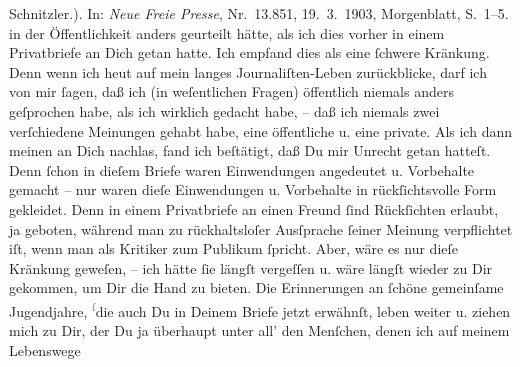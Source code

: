 \begin{ledgroupsized}[t]{13cm}
{{{{                        Schnitzler.)}. In: \emph{Neue Freie
                        Presse}, Nr. 13.851, 19. 3. 1903,
                     Morgenblatt, S. 1–5.}}}\label{K_L03478-4h} in der Öffentlichkeit anders geurteilt hätte, als ich dies vorher
               in einem Privatbriefe an Dich getan hatte. Ich empfand dies als eine ſchwere
               Kränkung. Denn wenn ich heut auf mein langes Journaliſten-Leben zurückblicke, darf
               ich von mir ſagen, daß ich (in weſentlichen Fragen) öffentlich niemals anders
               geſprochen habe, als ich wirklich gedacht habe, – daß ich niemals zwei verſchiedene
               Meinungen gehabt habe, eine öffentliche {\pb}u. eine
               private. Als ich dann meinen \label{K_L03478-5v}\label{K_L03478-5h} an Dich nachlas, fand ich beſtätigt, daß Du mir Unrecht getan hatteſt. Denn
               ſchon in dieſem Briefe waren Einwendungen angedeutet u. Vorbehalte gemacht – nur
               waren dieſe Einwendungen u. Vorbehalte in rückſichtsvolle Form gekleidet. Denn in
               einem Privatbriefe an einen Freund ſind Rückſichten erlaubt, ja geboten, während man
               zu rückhaltsloſer Ausſprache ſeiner Meinung verpflichtet iſt, wenn man als Kritiker
               zum Publikum ſpricht.\pend
           \pstart
           Aber, wäre es nur {\pb}dieſe Kränkung geweſen, – ich
               hätte ſie längſt vergeſſen u. wäre längſt wieder zu Dir gekommen, um Dir die Hand zu
               bieten. Die Erinnerungen an ſchöne gemeinſame Jugendjahre, \substVorne{}\textsuperscript{\textcolor{gray}{ſ}}\substDazwischen{}d\substHinten{}ie auch Du in Deinem Briefe jetzt erwähnſt, leben weiter u. ziehen mich zu
               Dir, der Du ja überhaupt unter all’ den Menſchen, denen ich auf meinem Lebenswege

\end{ledgroupsized}
